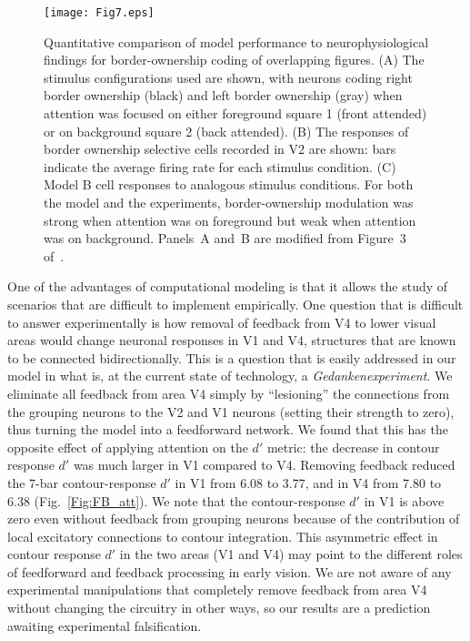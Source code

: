 {\begin{figure}
\begin{center}
\texttt{[image: Fig7.eps]}
\end{center}
\caption{Quantitative comparison of model performance to
  neurophysiological findings \citep{Qiu_etal07} for border-ownership coding of
  overlapping figures. (A) The stimulus configurations used are shown,
  with neurons coding right border ownership (black) and left border
  ownership (gray) when attention was focused on either foreground
  square 1 (front attended) or on background square 2 (back
  attended). (B) The responses of border ownership selective cells
  recorded in V2 are shown:  bars indicate the
  average firing rate 
  for each stimulus condition. (C) Model B cell responses to analogous
  stimulus conditions. For both the model and the experiments,
  border-ownership modulation was strong when attention was on
  foreground but weak when attention was on background. %
Panels~A and~B are modified from Figure~3 of~\cite{Qiu_etal07}.} 
\label{Fig:Overlap_Square_exp_model}
\end{figure}

One of the advantages of computational modeling is that it allows the
study of scenarios that are difficult to implement empirically.
One question that is difficult to answer experimentally is how removal of
feedback 
from V4 to lower visual areas
%
would change neuronal responses in V1 and V4, structures that
are known to be connected bidirectionally. This is a question that is
easily addressed in our model in what is, at the current state of
technology, a {\em Gedankenexperiment}. We eliminate all feedback from area
V4  simply by ``lesioning'' the 
connections from the grouping neurons to the V2 and V1 neurons
(setting their strength to zero), thus turning the model into a
feedforward network.  We found that this has the opposite effect of
applying attention on the $d'$ metric: the decrease in contour
response $d'$ was much larger in V1 compared to V4. Removing feedback
reduced the 7-bar contour-response $d'$ in V1 from 6.08 to 3.77, and
in V4 from 7.80 to 6.38 (Fig.~\ref{Fig:FB_att}). We note that the
contour-response $d'$ in V1 is above zero even without feedback from
grouping neurons because of the contribution of local
excitatory connections to contour integration.
This asymmetric
effect in contour response $d'$ in the two areas (V1 and V4) may point
to the different roles of feedforward and feedback processing in early
vision. We are not aware of any experimental manipulations that completely
remove feedback from area V4 without changing the circuitry in other
ways, so our results are a prediction awaiting experimental
falsification.

}
